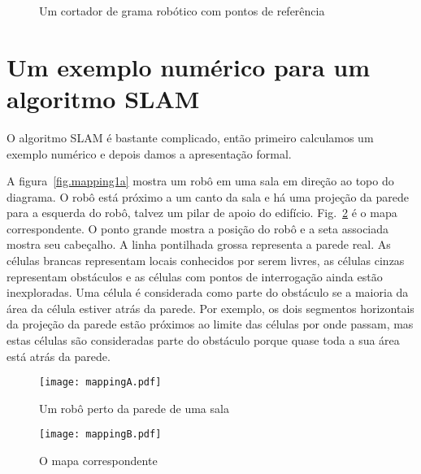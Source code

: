\begin{figure}
\begin{center}
\end{center}
\caption{Um cortador de grama robótico com pontos de referência}\label{fig.lawn-landmarks}
\end{figure}

\section{Um exemplo numérico para um algoritmo SLAM}\label{s.slam-numerical}

O algoritmo SLAM é bastante complicado, então primeiro calculamos um exemplo numérico e depois damos a apresentação formal.

A figura~\ref{fig.mapping1a} mostra um robô em uma sala em direção ao topo do diagrama. O robô está próximo a um canto da sala e há uma projeção da parede para a esquerda do robô, talvez um pilar de apoio do edifício. Fig.~\ref{fig.mapping1b} é o mapa correspondente. O ponto grande mostra a posição do robô e a seta associada mostra seu cabeçalho. A linha pontilhada grossa representa a parede real. As células brancas representam locais conhecidos por serem livres, as células cinzas representam obstáculos e as células com pontos de interrogação ainda estão inexploradas. Uma célula é considerada como parte do obstáculo se a maioria da área da célula estiver atrás da parede. Por exemplo, os dois segmentos horizontais da projeção da parede estão próximos ao limite das células por onde passam, mas estas células são consideradas parte do obstáculo porque quase toda a sua área está atrás da parede.

\begin{figure}
\begin{minipage}{.45\textwidth}
\texttt{[image: mappingA.pdf]}
\caption{Um robô perto da parede de uma sala}
\label{fig.mapping1a}
\end{minipage}
\hspace{\fill}
\begin{minipage}{.45\textwidth}
\texttt{[image: mappingB.pdf]}
\caption{O mapa correspondente}
\label{fig.mapping1b}
\end{minipage}
\end{figure}

